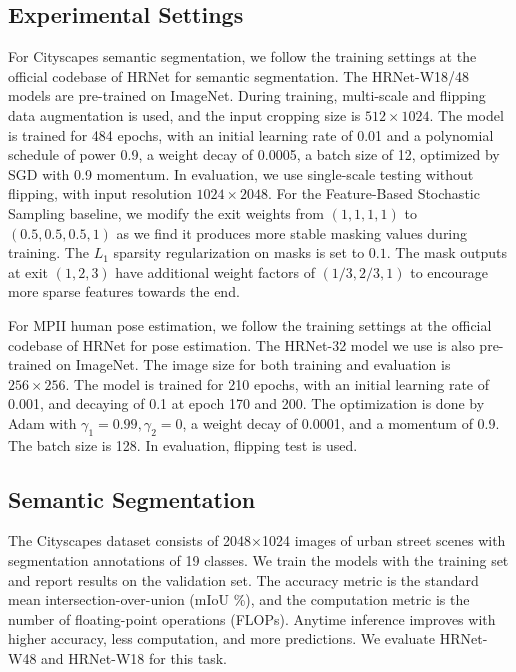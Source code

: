 \subsection{Experimental Settings}
\label{app:train}
For Cityscapes semantic segmentation, we follow the training settings at the official codebase \cite{hrnet_ss_github} of HRNet for semantic segmentation. The HRNet-W18/48 models are pre-trained on ImageNet. During training, multi-scale and flipping data augmentation is used, and the input cropping size is $512\times 1024$. The model is trained for 484 epochs, with an initial learning rate of 0.01 and a polynomial schedule of power 0.9, a weight decay of 0.0005, a batch size of 12, optimized by SGD with 0.9 momentum. In evaluation, we use single-scale testing without flipping, with input resolution $1024\times 2048$. For the Feature-Based Stochastic Sampling baseline, we modify the exit weights from $(1, 1, 1, 1)$ to $(0.5, 0.5, 0.5, 1)$ as we find it produces more stable masking values during training. The $L_1$ sparsity regularization on masks is set to $0.1$. The mask outputs at exit $(1,2,3)$ have additional weight factors of $(1/3, 2/3, 1)$ to encourage more sparse features towards the end.

For MPII human pose estimation, we follow the training settings at the official codebase \cite{hrnet_hpe_github} of HRNet for pose estimation. The HRNet-32 model we use is also pre-trained on ImageNet. The image size for both training and evaluation is $256\times 256$. The model is trained for 210 epochs, with an initial learning rate of 0.001, and decaying of 0.1 at epoch 170 and 200. The optimization is done by Adam with $\gamma_1=0.99, \gamma_2=0$, a weight decay of 0.0001, and a momentum of 0.9. The batch size is 128. In evaluation, flipping test is used.

\subsection{Semantic Segmentation}
The Cityscapes dataset \cite{cordts2016cityscapes} consists of 2048$\times$1024 images of urban street scenes with segmentation annotations of 19 classes.
We train the models with the training set and report results on the validation set.
The accuracy metric is the standard mean intersection-over-union (mIoU \%), and the computation metric is the number of floating-point operations (FLOPs).
Anytime inference improves with higher accuracy, less computation, and more predictions.
We evaluate HRNet-W48 and HRNet-W18 for this task.


